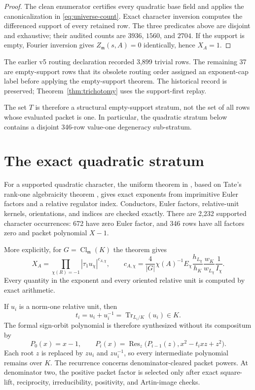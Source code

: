\documentclass[11pt]{article}
\newcommand{\Cl}{\operatorname{Cl}}
\begin{document}
\begin{proof}
The clean enumerator certifies every quadratic base field and applies
the canonicalization in \eqref{eq:universe-count}.  Exact character
inversion computes the differenced support of every retained row.
The three predicates above are disjoint and exhaustive; their audited
counts are $3936$, $1560$, and $2704$.  If the support is empty, Fourier
inversion gives $Z_{\mathfrak m}(s,A)=0$ identically, hence $X_A=1$.
\end{proof}

The earlier v5 routing declaration recorded 3,899 trivial rows.  The
remaining 37 are empty-support rows that its obsolete routing order
assigned an exponent-cap label before applying the empty-support theorem.
The historical record is preserved; Theorem~\ref{thm:trichotomy} uses the
support-first replay.

The set $T$ is therefore a structural empty-support stratum, not the
set of all rows whose evaluated packet is one.  In particular, the
quadratic stratum below contains a disjoint 346-row value-one
degeneracy sub-stratum.

\section{The exact quadratic stratum}

For a supported quadratic character, the uniform theorem in
\cite{ZhaoResults}, based on Tate's rank-one algebraicity theorem
\cite[Thm.~IV.5.4]{Tate1984}, gives exact exponents from imprimitive Euler
factors and a relative regulator index.  Conductors, Euler factors,
relative-unit kernels, orientations, and indices are checked exactly.
There are 2,232 supported character occurrences: 672 have zero Euler
factor, and 346 rows have all factors zero and packet polynomial $X-1$.

More explicitly, for $G=\Cl_{\mathfrak m}(K)$ the theorem gives
\begin{equation}\label{eq:quadratic-product}
 X_A=\prod_{\chi(R)=-1}|\tau_1u_\chi|^{c_{A,\chi}},\qquad
 c_{A,\chi}=\frac{4}{|G|}\chi(A)^{-1}E_\chi
 \frac{h_{L_\chi}}{h_K}\frac{w_K}{w_{L_\chi}}\frac1{I_\chi}.
\end{equation}
Every quantity in the exponent and every oriented relative unit is
computed by exact arithmetic.

If $u_i$ is a norm-one relative unit, then
\[t_i=u_i+u_i^{-1}=\operatorname{Tr}_{L_i/K}(u_i)\in K.\]
The formal sign-orbit polynomial is therefore synthesized without its
compositum by
\begin{equation}\label{eq:trace-descent}
P_0(x)=x-1,\qquad
P_i(x)=\operatorname{Res}_z\bigl(P_{i-1}(z),x^2-t_i xz+z^2\bigr).
\end{equation}
Each root $z$ is replaced by $zu_i$ and $zu_i^{-1}$, so every intermediate
polynomial remains over $K$.  The recurrence concerns
denominator-cleared packet powers.  At denominator two, the positive
packet factor is selected only after exact square-lift, reciprocity,
irreducibility, positivity, and Artin-image checks.
\end{document}
